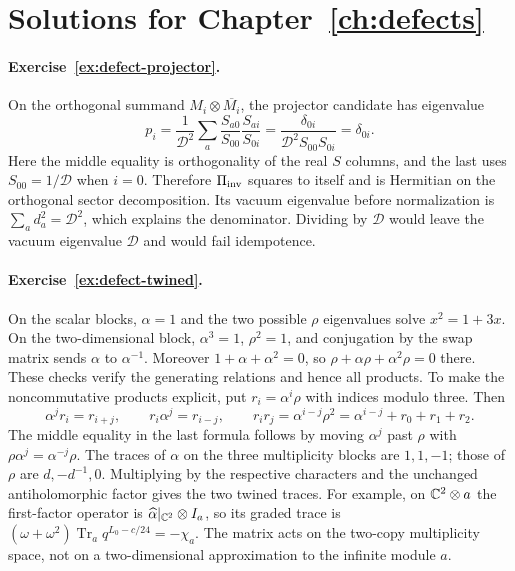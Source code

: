 \section{Solutions for Chapter~\ref{ch:defects}}

\paragraph{Exercise~\ref{ex:defect-projector}.}
\label{sol:ex:defect-projector}
On the orthogonal summand $M_i\otimes\overline{M_i}$, the
projector candidate has eigenvalue
\[
 p_i=\frac1{\mathcal D^2}\sum_a
       \frac{S_{a0}}{S_{00}}\frac{S_{ai}}{S_{0i}}
 =\frac{\delta_{0i}}{\mathcal D^2S_{00}S_{0i}}
 =\delta_{0i}.
\]
Here the middle equality is orthogonality of the real $S$
columns, and the last uses $S_{00}=1/\mathcal D$ when $i=0$.
Therefore $\Pi_{\rm inv}$ squares
to itself and is Hermitian on the orthogonal sector
decomposition. Its vacuum eigenvalue before normalization
is $\sum_a d_a^2=\mathcal D^2$, which explains the
denominator. Dividing by $\mathcal D$ would leave the
vacuum eigenvalue $\mathcal D$ and would fail idempotence.



\paragraph{Exercise~\ref{ex:defect-twined}.}
\label{sol:ex:defect-twined}
On the scalar blocks, $\alpha=1$ and the two possible
$\rho$ eigenvalues solve $x^2=1+3x$.
On the two-dimensional block,
$\alpha^3=1$, $\rho^2=1$, and conjugation by the swap
matrix sends $\alpha$ to $\alpha^{-1}$. Moreover
$1+\alpha+\alpha^2=0$, so
$\rho+\alpha\rho+\alpha^2\rho=0$ there. These checks
verify the generating relations and hence all products.
To make the noncommutative products explicit, put
$r_i=\alpha^i\rho$ with indices modulo three. Then
\[
 \alpha^j r_i=r_{i+j},\qquad
 r_i\alpha^j=r_{i-j},\qquad
 r_i r_j=\alpha^{i-j}\rho^2
        =\alpha^{i-j}+r_0+r_1+r_2.
\]
The middle equality in the last formula follows by moving
$\alpha^j$ past $\rho$ with $\rho\alpha^j=\alpha^{-j}\rho$.
The traces of $\alpha$ on the three multiplicity blocks
are $1,1,-1$; those of $\rho$ are $d,-d^{-1},0$.
Multiplying by the respective characters and the unchanged
antiholomorphic factor gives the two twined traces.
For example, on $\mathbb C^2\otimes a$ the first-factor operator is
$\widehat\alpha|_{\mathbb C^2}\otimes I_a$, so its graded trace
is $(\omega+\omega^2)\operatorname{Tr}_a q^{L_0-c/24}
=-\chi_a$. The matrix acts on the two-copy multiplicity
space, not on a two-dimensional approximation to the infinite
module $a$.



